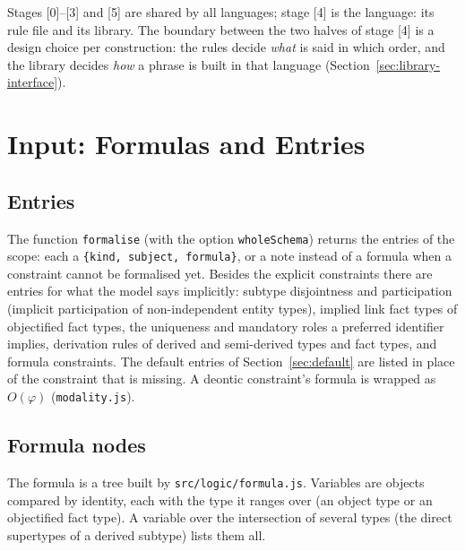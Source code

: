 \documentclass[11pt, a4paper]{article}
\newcommand{\code}[1]{\texttt{\color{codefg}#1}}
\begin{document}
Stages [0]--[3] and [5] are shared by all languages; stage [4] is the
language: its rule file and its library. The boundary between the two halves
of stage [4] is a design choice per construction: the rules decide
\emph{what} is said in which order, and the library decides \emph{how} a
phrase is built in that language (Section~\ref{sec:library-interface}).

\section{Input: Formulas and Entries}
\label{sec:logic}

\subsection{Entries}

The function \code{formalise} (with the option \code{wholeSchema}) returns the entries of the scope:
each a \code{\{kind, subject, formula\}}, or a note instead of a formula when
a constraint cannot be formalised yet. Besides the explicit constraints there
are entries for what the model says implicitly: subtype disjointness and
participation (implicit participation of non-independent entity types),
implied link fact types of objectified fact types, the uniqueness and
mandatory roles a preferred identifier implies, derivation rules of derived
and semi-derived types and fact types, and formula constraints. The default
entries of Section~\ref{sec:default} are listed in place of the constraint
that is missing. A deontic constraint's formula is wrapped as $O(\varphi)$
(\code{modality.js}).

\subsection{Formula nodes}

The formula is a tree built by \code{src/logic/formula.js}. Variables are
objects compared by identity, each with the type it ranges over (an object
type or an objectified fact type). A variable over the intersection of
several types (the direct supertypes of a derived subtype) lists them all.
\end{document}
